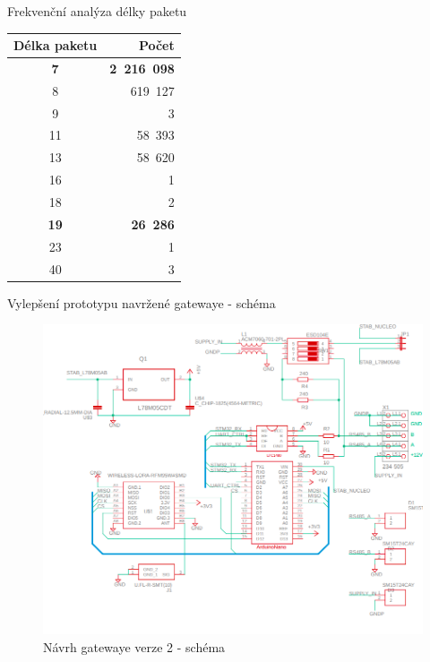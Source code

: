 \documentclass{beamer}
\begin{document}
\begin{frame} {Frekvenční analýza délky paketu}

	\begin{longtable} {|c|r|}
					\hline
			Délka paketu &  Počet \\ \hline
			\textbf{7}  &  \textbf{2~216~098}  \\
			8  &   619~127   \\
			9  &         3   \\
			11 &    58~393   \\
			13 &    58~620   \\
			16 &         1   \\
			18 &         2   \\
			\textbf{19} &    \textbf{26~286}   \\
			23 &         1   \\
			40 &         3   \\
			\hline
		\end{longtable}

\end{frame}


\begin{frame}{Vylepšení prototypu navržené gatewaye - schéma}
	\begin{figure}[!h]
		\centering
		\includegraphics[width=1\textwidth]{minigateway_schema}
		\caption{Návrh gatewaye verze 2 - schéma}
		\label{fig:minigateway_schema}
	\end{figure}
\end{frame}














\end{document}
